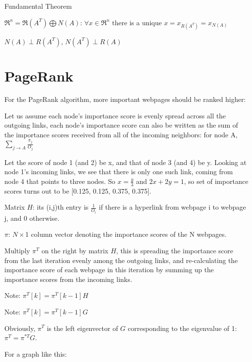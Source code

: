 Fundamental Theorem

$\Re^n = \Re(A^T) \bigoplus N(A)$: $\forall x\in \Re^n$ there is a unique $x = x_{R(A^T)} = x_{N(A)}$ 

$N(A) \perp R(A^T)$, $N(A^T) \perp R(A)$


\section{PageRank}


For the PageRank algorithm, more important webpages should be ranked higher:


Let us assume each node's importance score is evenly spread across all the outgoing links, each node’s importance score can also be written as the sum of the importance scores received from all of the incoming neighbors: for node A, $\sum_{j \rightarrow A}\frac{\pi_j}{O_j}$

\begin{figure}
	\centering
	\resizebox{7.5cm}{3cm}{}
	\caption{}
	\label{}
\end{figure}


Let the score of node 1 (and 2) be x, and that of node 3 (and 4) be y. Looking at node 1’s incoming links, we see that there is only one such link, coming from node 4 that points to three nodes. So $x = \frac{y}{3}$ and $2x + 2y = 1$, so set of importance scores turns out to be [0.125, 0.125, 0.375, 0.375].

Matrix $H$: its (i,j)th entry is $\frac{1}{O_i}$ if there is a hyperlink from webpage i to webpage j, and 0 otherwise.

$\pi$: $N \times$1 column vector denoting the importance scores of the N webpages.

Multiply $\pi^T$ on the right by matrix $H$, this is spreading the importance score from the last iteration evenly among the outgoing links, and re-calculating the importance score of each webpage in this iteration by summing up the importance scores from the incoming links.

Note: $\pi^T[k] = \pi^T[k - 1]H$



Note: $\pi^T[k] = \pi^T[k - 1]G$

Obviously, $\pi^{T}$ is the left eigenvector of $G$ corresponding to the eigenvalue of 1: $\pi^{T} = \pi^{*T}G$.

For a graph like this:

\begin{figure}
	\centering
	\resizebox{7.5cm}{3cm}{}
	\caption{}
	\label{}
\end{figure}


